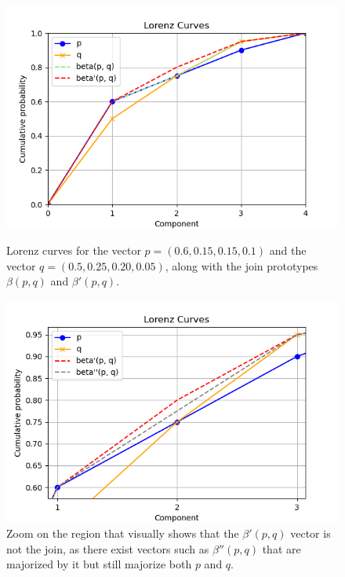 \begin{figure}[h!]
    \centering
    \begin{minipage}{.48\textwidth}
        \centering
        \includegraphics[scale=0.5]{images/join_first_attempt.png}
        \caption{Lorenz curves for the vector $p = (0.6, 0.15, 0.15, 0.1)$ and the vector $q = (0.5, 0.25, 0.20, 0.05)$, along with the join prototypes $\beta(p, q)$ and $\beta'(p, q)$.}
        \label{fig:first_join_attempt}
    \end{minipage}
    \hfill
    \begin{minipage}{0.48\textwidth} 
        \centering
        \includegraphics[scale=0.5]{images/join_second_attempt.png}
        \caption{Zoom on the region that visually shows that the $\beta'(p, q)$ vector is not the join, as there exist vectors such as $\beta''(p, q)$ that are majorized by it but still majorize both $p$ and $q$.} 
        \label{fig:second_join_attempt}
    \end{minipage}
\end{figure}

